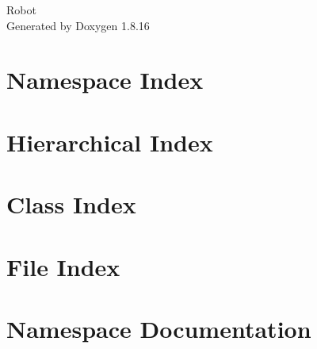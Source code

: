 \let\mypdfximage\pdfximage\def\pdfximage{\immediate\mypdfximage}\documentclass[twoside]{book}
\newcommand{\+}{\discretionary{\mbox{\scriptsize$\hookleftarrow$}}{}{}}
\newcommand{\clearemptydoublepage}{%
  \newpage{\pagestyle{empty}\cleardoublepage}%
}
\begin{document}
\hypersetup{pageanchor=false,
             bookmarksnumbered=true,
             pdfencoding=unicode
            }
\begin{titlepage}
\vspace*{7cm}
\begin{center}%
{\Large Robot }\\
\vspace*{1cm}
{\large Generated by Doxygen 1.8.16}\\
\end{center}
\end{titlepage}
\clearemptydoublepage
{}
\tableofcontents
\clearemptydoublepage
{}
\hypersetup{pageanchor=true}

\chapter{Namespace Index}

\chapter{Hierarchical Index}

\chapter{Class Index}

\chapter{File Index}

\chapter{Namespace Documentation}






\end{document}
